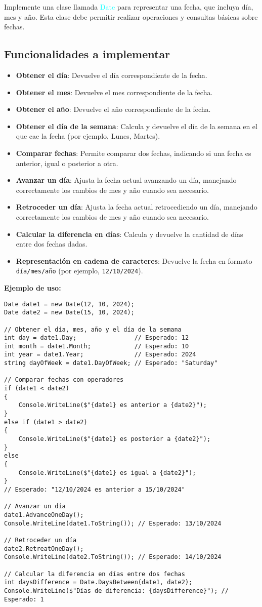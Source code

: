 Implemente una clase llamada \textcolor{cyan}{Date} para representar una fecha, que incluya día, mes y año. Esta clase debe permitir realizar operaciones y consultas básicas sobre fechas.

\subsection*{Funcionalidades a implementar}
\begin{itemize}
    \item \textbf{Obtener el día}: Devuelve el día correspondiente de la fecha.
    \item \textbf{Obtener el mes}: Devuelve el mes correspondiente de la fecha.
    \item \textbf{Obtener el año}: Devuelve el año correspondiente de la fecha.
    \item \textbf{Obtener el día de la semana}: Calcula y devuelve el día de la semana en el que cae la fecha (por ejemplo, Lunes, Martes).
    \item \textbf{Comparar fechas}: Permite comparar dos fechas, indicando si una fecha es anterior, igual o posterior a otra.
    \item \textbf{Avanzar un día}: Ajusta la fecha actual avanzando un día, manejando correctamente los cambios de mes y año cuando sea necesario.
    \item \textbf{Retroceder un día}: Ajusta la fecha actual retrocediendo un día, manejando correctamente los cambios de mes y año cuando sea necesario.
    \item \textbf{Calcular la diferencia en días}: Calcula y devuelve la cantidad de días entre dos fechas dadas.
    \item \textbf{Representación en cadena de caracteres}: Devuelve la fecha en formato \texttt{día/mes/año} (por ejemplo, \texttt{12/10/2024}).
\end{itemize}

\textbf{Ejemplo de uso:}
\begin{lstlisting}
Date date1 = new Date(12, 10, 2024);
Date date2 = new Date(15, 10, 2024);

// Obtener el día, mes, año y el día de la semana
int day = date1.Day;                // Esperado: 12
int month = date1.Month;            // Esperado: 10
int year = date1.Year;              // Esperado: 2024
string dayOfWeek = date1.DayOfWeek; // Esperado: "Saturday"

// Comparar fechas con operadores
if (date1 < date2)
{
    Console.WriteLine($"{date1} es anterior a {date2}");
}
else if (date1 > date2)
{
    Console.WriteLine($"{date1} es posterior a {date2}");
}
else
{
    Console.WriteLine($"{date1} es igual a {date2}");
}
// Esperado: "12/10/2024 es anterior a 15/10/2024"

// Avanzar un día
date1.AdvanceOneDay();
Console.WriteLine(date1.ToString()); // Esperado: 13/10/2024

// Retroceder un día
date2.RetreatOneDay();
Console.WriteLine(date2.ToString()); // Esperado: 14/10/2024

// Calcular la diferencia en días entre dos fechas
int daysDifference = Date.DaysBetween(date1, date2);
Console.WriteLine($"Días de diferencia: {daysDifference}"); // Esperado: 1
\end{lstlisting}